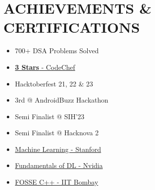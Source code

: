 \documentclass[letterpaper,11pt]{article}
\newcommand\sbullet[1][.5]{\mathbin{\vcenter{\hbox{\scalebox{#1}{$\bullet$}}}}}
\begin{document}
 
\section{ACHIEVEMENTS \& CERTIFICATIONS}
 \vspace{-1pt}

        \begin{multicols}{3}
            \begin{itemize}[itemsep=-4pt]
                \item 700+ DSA Problems Solved
                \item \href{https://www.codechef.com/users/ruthlessruler}{\textbf{3 Stars} - CodeChef {\raisebox{-0.1\height}{\faExternalLink*}} }
                \item Hacktoberfest 21, 22 \& 23
                \item 3rd @ AndroidBuzz Hackathon
                \item Semi Finalist @ SIH'23
                \item Semi Finalist @ Hacknova 2
                \item \href{https://coursera.org/share/c715d24542b410805a2ff3034949858d}{Machine Learning - Stanford {\raisebox{-0.1\height}{\faExternalLink*} }}
                \item \href{https://courses.nvidia.com/certificates/b38a698150c5410c9afeb954cf87468c/}{Fundamentals of DL - Nvidia {\raisebox{-0.1\height}{\faExternalLink*} }}
                \item \href{https://drive.google.com/file/d/10mALMGuQrSt5Pmxue66Xjh8aFSsbpBtX/view}{FOSSE C++ - IIT Bombay {\raisebox{-0.1\height}{\faExternalLink*} }}

            \end{itemize}
        \end{multicols}

\end{document}
